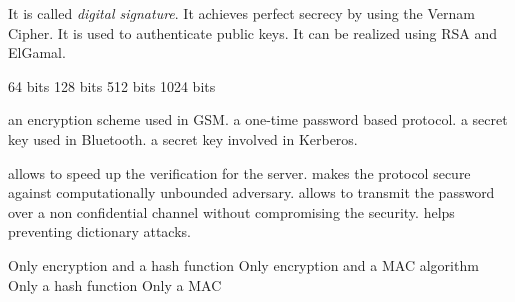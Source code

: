 {It is called \textit{digital signature}.}
{It achieves perfect secrecy by using the Vernam Cipher.}
{It is used to authenticate public keys.}
{It can be realized using RSA and ElGamal.}

{64 bits}
{128 bits}
{512 bits}
{1024 bits}

%
{an encryption scheme used in GSM.}%
{a one-time password based protocol.}%
{a secret key used in Bluetooth.}%
{a secret key involved in Kerberos.}%

{allows to speed up the verification for the server.}
{makes the protocol secure against computationally unbounded adversary.}
{allows to transmit the password over a non confidential channel without compromising the security.}
{helps preventing dictionary attacks.}

{Only encryption and a hash function}       
{Only encryption and a MAC algorithm}            
{Only a hash function}            
{Only a MAC}  




 


	
	